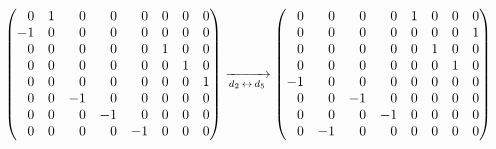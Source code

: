 \documentclass[a4paper,11pt]{article}
\numberwithin{equation}{section}
\begin{document}
\begin{equation}
  \label{eq:Wojtynski-25}
  \begin{split}
    &\begin{pmatrix}
       \hphantom{-} 0 & 1 & \hphantom{-} 0 & \hphantom{-} 0
       & \hphantom{-} 0 & 0 & 0 & 0 \\
       -1 & 0 & \hphantom{-} 0 & \hphantom{-} 0 & \hphantom{-} 0
                        & 0 & 0 & 0 \\
       \hphantom{-} 0 & 0 & \hphantom{-} 0 & \hphantom{-} 0
       & \hphantom{-} 0 & 1 & 0 & 0 \\
       \hphantom{-} 0 & 0 & \hphantom{-} 0 & \hphantom{-} 0
       & \hphantom{-} 0 & 0 & 1 & 0 \\
       \hphantom{-} 0 & 0 & \hphantom{-} 0 & \hphantom{-} 0
       & \hphantom{-} 0 & 0 & 0 & 1 \\
       \hphantom{-} 0 & 0 & -1 & \hphantom{-} 0 & \hphantom{-} 0
                        & 0 & 0 & 0 \\
       \hphantom{-} 0 & 0 & \hphantom{-} 0 & -1 & \hphantom{-} 0
                        & 0 & 0 & 0 \\
       \hphantom{-} 0 & 0 & \hphantom{-} 0 & \hphantom{-} 0 & -1
                        & 0 & 0 & 0
     \end{pmatrix}
      \xrightarrow[ d_{ 2 } \, \leftrightarrow \, d_{ 5 } ]{}
      \begin{pmatrix}
        \hphantom{-} 0 & \hphantom{-} 0 & \hphantom{-} 0 & \hphantom{-} 0
        & 1 & 0 & 0 & 0 \\
        \hphantom{-} 0 & \hphantom{-} 0 & \hphantom{-} 0 & \hphantom{-} 0
        & 0 & 0 & 0 & 1 \\
        \hphantom{-} 0 & \hphantom{-} 0 & \hphantom{-} 0 & \hphantom{-} 0
        & 0 & 1 & 0 & 0 \\
        \hphantom{-} 0 & \hphantom{-} 0 & \hphantom{-} 0 & \hphantom{-} 0
        & 0 & 0 & 1 & 0 \\
        -1 & \hphantom{-} 0 & \hphantom{-} 0 & \hphantom{-} 0 & 0 & 0 & 0
                    & 0 \\
        \hphantom{-} 0 & \hphantom{-} 0 & -1 & \hphantom{-} 0 & 0 & 0 & 0
                    & 0 \\
        \hphantom{-} 0 & \hphantom{-} 0 & \hphantom{-} 0 & -1 & 0 & 0 & 0
                    & 0 \\
        \hphantom{-} 0 & -1 & \hphantom{-} 0 & \hphantom{-} 0 & 0 & 0 & 0
                    & 0 \\

\end{pmatrix}
\end{split}
\end{equation}
\end{document}
